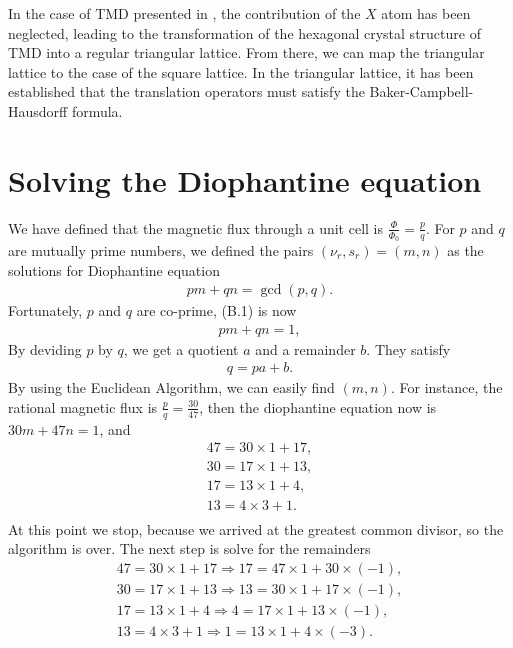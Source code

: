 \documentclass{report}
\begin{document}
In the case of TMD presented in \cite{PhysRevB.88.085433}, the contribution of the
$X$ atom has been neglected, leading to the transformation of the hexagonal crystal structure of TMD into a regular triangular lattice. From there, we can map the triangular lattice to the case of the square lattice. In the triangular lattice, it has been established that the translation operators must satisfy the Baker-Campbell-Hausdorff formula.
\chapter{Solving the Diophantine equation}
We have defined that the magnetic flux through a unit cell is $\frac{\Phi}{\Phi_{0}} = \frac{p}{q}$. For $p$ and $q$ are mutually prime numbers, we defined the pairs $(\nu_{r},s_{r})=(m,n)$ as the solutions for Diophantine equation
\begin{gather}
	p m + q n  = \gcd(p,q).
\end{gather}
Fortunately, $p$ and $q$ are co-prime, (B.1) is now
\begin{gather}
	pm + qn = 1,
\end{gather}
By deviding $p$ by $q$, we get a quotient $a$ and a remainder $b$. They satisfy
\begin{gather}
	q = p a + b.
\end{gather}
By using the Euclidean Algorithm, we can easily find $(m,n)$. For instance, the rational magnetic flux is $\frac{p}{q} = \frac{30}{47}$, then the diophantine equation now is $30m + 47n = 1$, and
\begin{equation}
	\begin{aligned}
		47 = 30 \times 1 + 17, \\
		30 = 17 \times 1 + 13, \\
		17 = 13 \times 1 + 4,  \\
		13 = 4 \times 3 + 1.   \\
	\end{aligned}
\end{equation}
At this point we stop, because we arrived at the greatest common divisor, so the algorithm is over. The next step is solve for the remainders
\begin{equation}
	\begin{aligned}
		47 = 30 \times 1 + 17 \Rightarrow 17 = 47 \times 1 + 30 \times (-1), \\
		30 = 17 \times 1 + 13 \Rightarrow 13 = 30 \times 1 + 17 \times (-1), \\
		17 = 13 \times 1 + 4 \Rightarrow 4 = 17 \times 1 + 13 \times (-1),   \\
		13 = 4 \times 3 + 1 \Rightarrow 1 = 13 \times 1 + 4 \times (-3).
	\end{aligned}
\end{equation}
\end{document}
